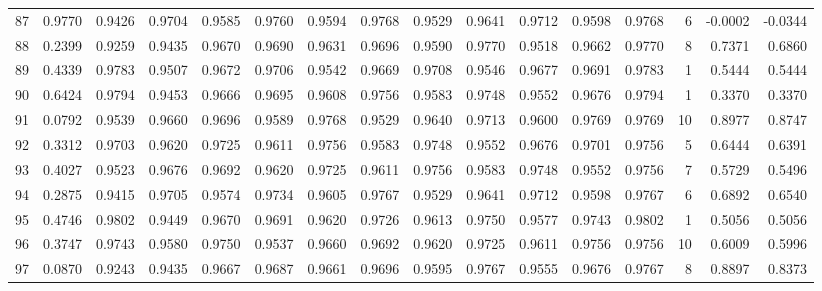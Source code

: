 \begin{tabular}{lrrrrrrrrrrrrrrr}
87  &      0.9770 &  0.9426 &  0.9704 &  0.9585 &  0.9760 &  0.9594 &  0.9768 &  0.9529 &  0.9641 &  0.9712 &   0.9598 &     0.9768 &      6 &                   -0.0002 &                    -0.0344 \\
88  &      0.2399 &  0.9259 &  0.9435 &  0.9670 &  0.9690 &  0.9631 &  0.9696 &  0.9590 &  0.9770 &  0.9518 &   0.9662 &     0.9770 &      8 &                    0.7371 &                     0.6860 \\
89  &      0.4339 &  0.9783 &  0.9507 &  0.9672 &  0.9706 &  0.9542 &  0.9669 &  0.9708 &  0.9546 &  0.9677 &   0.9691 &     0.9783 &      1 &                    0.5444 &                     0.5444 \\
90  &      0.6424 &  0.9794 &  0.9453 &  0.9666 &  0.9695 &  0.9608 &  0.9756 &  0.9583 &  0.9748 &  0.9552 &   0.9676 &     0.9794 &      1 &                    0.3370 &                     0.3370 \\
91  &      0.0792 &  0.9539 &  0.9660 &  0.9696 &  0.9589 &  0.9768 &  0.9529 &  0.9640 &  0.9713 &  0.9600 &   0.9769 &     0.9769 &     10 &                    0.8977 &                     0.8747 \\
92  &      0.3312 &  0.9703 &  0.9620 &  0.9725 &  0.9611 &  0.9756 &  0.9583 &  0.9748 &  0.9552 &  0.9676 &   0.9701 &     0.9756 &      5 &                    0.6444 &                     0.6391 \\
93  &      0.4027 &  0.9523 &  0.9676 &  0.9692 &  0.9620 &  0.9725 &  0.9611 &  0.9756 &  0.9583 &  0.9748 &   0.9552 &     0.9756 &      7 &                    0.5729 &                     0.5496 \\
94  &      0.2875 &  0.9415 &  0.9705 &  0.9574 &  0.9734 &  0.9605 &  0.9767 &  0.9529 &  0.9641 &  0.9712 &   0.9598 &     0.9767 &      6 &                    0.6892 &                     0.6540 \\
95  &      0.4746 &  0.9802 &  0.9449 &  0.9670 &  0.9691 &  0.9620 &  0.9726 &  0.9613 &  0.9750 &  0.9577 &   0.9743 &     0.9802 &      1 &                    0.5056 &                     0.5056 \\
96  &      0.3747 &  0.9743 &  0.9580 &  0.9750 &  0.9537 &  0.9660 &  0.9692 &  0.9620 &  0.9725 &  0.9611 &   0.9756 &     0.9756 &     10 &                    0.6009 &                     0.5996 \\
97  &      0.0870 &  0.9243 &  0.9435 &  0.9667 &  0.9687 &  0.9661 &  0.9696 &  0.9595 &  0.9767 &  0.9555 &   0.9676 &     0.9767 &      8 &                    0.8897 &                     0.8373 \\

\end{tabular}
